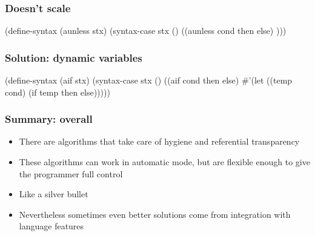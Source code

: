 \documentclass[hyperref={bookmarks=false}]{beamer}
\begin{document}
\begin{frame}[fragile]
\frametitle{Doesn't scale}
\begin{semiverbatim}

(define-syntax (aunless stx)
  (syntax-case stx ()
    ((aunless cond then else)
     )))

\end{semiverbatim}
\end{frame}

\begin{frame}[fragile]
\frametitle{Solution: dynamic variables}
\begin{semiverbatim}


(define-syntax (aif stx)
  (syntax-case stx ()
    ((aif cond then else)
       #'(let ((temp cond)
           (if temp then else)))))
\end{semiverbatim}
\end{frame}

\begin{frame}[fragile]
\frametitle{Summary: overall}
\begin{itemize}
\item There are algorithms that take care of hygiene and referential transparency
\item These algorithms can work in automatic mode, but are flexible enough to give the programmer full control
\item Like a silver bullet
\item Nevertheless sometimes even better solutions come from integration with language features
\end{itemize}
\end{frame}
\end{document}
